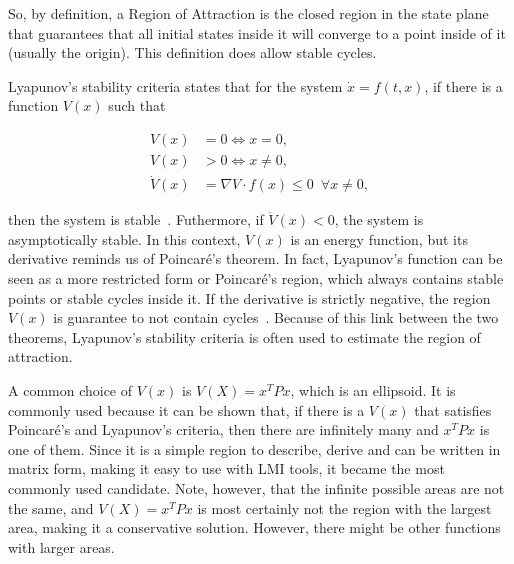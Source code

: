 So, by definition, a Region of Attraction is the closed region in the state
plane that guarantees that all initial states inside it will converge to a point
inside of it (usually the origin). This definition does allow stable cycles.

Lyapunov's stability criteria states that for the system \(\dot{x} = f(t, x)\),
if there is a function \(V(x)\) such that

\begin{align}
	V(x)       & = 0 \iff x = 0,                                \\
	V(x)       & > 0 \iff x \ne 0,                              \\
	\dot{V}(x) & = \nabla{}V\cdot{}f(x) \le 0 \phantom{0} \forall x \ne 0,
\end{align}

then the system is stable~\parencite{chen:linear,hespanha:linear}. Futhermore,
if \(\dot{V}(x)<0\), the system is asymptotically stable. In this context,
\(V(x)\) is an energy function, but its derivative reminds us of Poincaré's
theorem. In fact, Lyapunov's function can be seen as a more restricted form or
Poincaré's region, which always contains stable points or stable cycles inside
it. If the derivative is strictly negative, the region \(V(x)\) is guarantee to
not contain cycles~\parencite{chen:linear}. Because of this link between the two
theorems, Lyapunov's stability criteria is often used to estimate the region of
attraction.

A common choice of \(V(x)\) is \(V(X)=x^{T}Px\), which is an ellipsoid. It is
commonly used because it can be shown that, if there is a \(V(x)\) that
satisfies Poincaré's and Lyapunov's criteria, then there are infinitely many and
\(x^{T}Px\) is one of them. Since it is a simple region to describe, derive and
can be written in matrix form, making it easy to use with LMI tools, it became
the most commonly used candidate. Note, however, that the infinite possible
areas are not the same, and \(V(X)=x^{T}Px\) is most certainly not the region
with the largest area, making it a conservative solution. However, there might
be other functions with larger areas.
